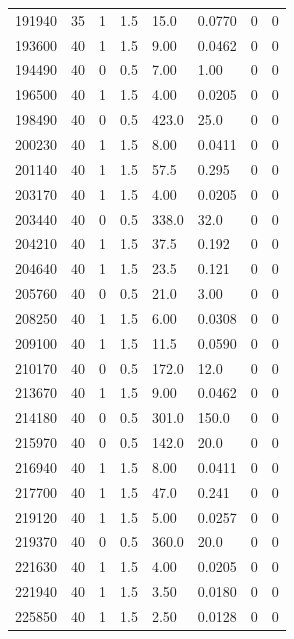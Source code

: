 \documentclass[preview]{standalone}
\begin{document}
{{{{{{{\begin{tabular}{L{1.2cm}C{1.2cm} C{0.3cm}C{0.5cm} C{1.4cm}C{1.4cm} C{1.4cm}C{1.4cm}}
  191940  &    35  & 1     & 1.5 &  15.0  & 0.0770  & 0 &  0   \\ 
  193600  &    40  & 1     & 1.5 &  9.00  & 0.0462  & 0 &  0   \\ 
  194490  &    40  & 0     & 0.5 &  7.00  & 1.00  & 0 &  0   \\ 
  196500  &    40  & 1     & 1.5 &  4.00  & 0.0205  & 0 &  0   \\ 
  198490  &    40  & 0     & 0.5 &  423.0  & 25.0  & 0 &  0   \\ 
  200230  &    40  & 1     & 1.5 &  8.00  & 0.0411  & 0 &  0   \\ 
  201140  &    40  & 1     & 1.5 &  57.5  & 0.295  & 0 &  0   \\ 
  203170  &    40  & 1     & 1.5 &  4.00  & 0.0205  & 0 &  0   \\ 
  203440  &    40  & 0     & 0.5 &  338.0  & 32.0  & 0 &  0   \\ 
  204210  &    40  & 1     & 1.5 &  37.5  & 0.192  & 0 &  0   \\ 
  204640  &    40  & 1     & 1.5 &  23.5  & 0.121  & 0 &  0   \\ 
  205760  &    40  & 0     & 0.5 &  21.0  & 3.00  & 0 &  0   \\ 
  208250  &    40  & 1     & 1.5 &  6.00  & 0.0308  & 0 &  0   \\ 
  209100  &    40  & 1     & 1.5 &  11.5  & 0.0590  & 0 &  0   \\ 
  210170  &    40  & 0     & 0.5 &  172.0  & 12.0  & 0 &  0   \\ 
  213670  &    40  & 1     & 1.5 &  9.00  & 0.0462  & 0 &  0   \\ 
  214180  &    40  & 0     & 0.5 &  301.0  & 150.0  & 0 &  0   \\ 
  215970  &    40  & 0     & 0.5 &  142.0  & 20.0  & 0 &  0   \\ 
  216940  &    40  & 1     & 1.5 &  8.00  & 0.0411  & 0 &  0   \\ 
  217700  &    40  & 1     & 1.5 &  47.0  & 0.241  & 0 &  0   \\ 
  219120  &    40  & 1     & 1.5 &  5.00  & 0.0257  & 0 &  0   \\ 
  219370  &    40  & 0     & 0.5 &  360.0  & 20.0  & 0 &  0   \\ 
  221630  &    40  & 1     & 1.5 &  4.00  & 0.0205  & 0 &  0   \\ 
  221940  &    40  & 1     & 1.5 &  3.50  & 0.0180  & 0 &  0   \\ 
  225850  &    40  & 1     & 1.5 &  2.50  & 0.0128  & 0 &  0   \\ 
\hline 
\end{tabular} 

}}}}}}}
\end{document}
